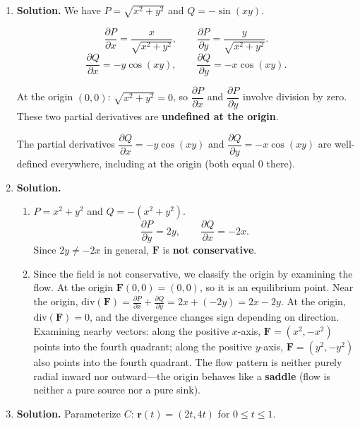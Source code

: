 \begin{enumerate}
To find the potential function: $f_x = 2xy \Rightarrow f = x^2y + g(y,z)$. Then $f_y = x^2 + g_y = x^2 + z^2$, so $g_y = z^2$, giving $g = yz^2 + h(z)$. Then $f_z = 2yz + h'(z) = 2yz$, so $h'(z)=0$ and $h$ is constant. Thus $f(x,y,z) = x^2y + yz^2 + C$.

\item \textbf{Solution.}
We have $P = \sqrt{x^2+y^2}$ and $Q = -\sin(xy)$.

\[
\frac{\partial P}{\partial x} = \frac{x}{\sqrt{x^2+y^2}}, \qquad
\frac{\partial P}{\partial y} = \frac{y}{\sqrt{x^2+y^2}}.
\]
\[
\frac{\partial Q}{\partial x} = -y\cos(xy), \qquad
\frac{\partial Q}{\partial y} = -x\cos(xy).
\]

At the origin $(0,0)$: $\sqrt{x^2+y^2}=0$, so $\dfrac{\partial P}{\partial x}$ and $\dfrac{\partial P}{\partial y}$ involve division by zero. These two partial derivatives are \textbf{undefined at the origin}.

The partial derivatives $\dfrac{\partial Q}{\partial x} = -y\cos(xy)$ and $\dfrac{\partial Q}{\partial y} = -x\cos(xy)$ are well-defined everywhere, including at the origin (both equal $0$ there).

\item \textbf{Solution.}
\begin{enumerate}
\item $P = x^2+y^2$ and $Q = -(x^2+y^2)$.
\[
\frac{\partial P}{\partial y} = 2y, \qquad \frac{\partial Q}{\partial x} = -2x.
\]
Since $2y \neq -2x$ in general, $\mathbf{F}$ is \textbf{not conservative}.

\item Since the field is not conservative, we classify the origin by examining the flow. At the origin $\mathbf{F}(0,0)=(0,0)$, so it is an equilibrium point. Near the origin, $\text{div}(\mathbf{F}) = \frac{\partial P}{\partial x} + \frac{\partial Q}{\partial y} = 2x + (-2y) = 2x - 2y$. At the origin, $\text{div}(\mathbf{F})=0$, and the divergence changes sign depending on direction. Examining nearby vectors: along the positive $x$-axis, $\mathbf{F}=(x^2, -x^2)$ points into the fourth quadrant; along the positive $y$-axis, $\mathbf{F}=(y^2, -y^2)$ also points into the fourth quadrant. The flow pattern is neither purely radial inward nor outward---the origin behaves like a \textbf{saddle} (flow is neither a pure source nor a pure sink).
\end{enumerate}

\item \textbf{Solution.}
Parameterize $C$: $\mathbf{r}(t) = (2t, 4t)$ for $0 \le t \le 1$.


\end{enumerate}
